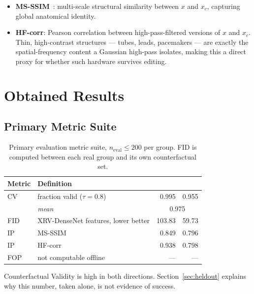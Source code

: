 \begin{itemize}[leftmargin=*]
  \item \textbf{MS-SSIM}~\cite{wang2003msssim}: multi-scale structural
        similarity between $x$ and $x_c$, capturing global anatomical
        identity.
  \item \textbf{HF-corr}: Pearson correlation between high-pass-filtered
        versions of $x$ and $x_c$. Thin, high-contrast structures ---
        tubes, leads, pacemakers --- are exactly the spatial-frequency
        content a Gaussian high-pass isolates, making this a direct proxy
        for whether such hardware survives editing.
\end{itemize}

\section{Obtained Results}

\subsection{Primary Metric Suite}

\begin{table}[h]
\centering
\caption[Primary evaluation metric suite]{Primary evaluation metric suite,
$n_{\text{eval}} \le 200$ per group. FID is computed between each real
group and its own counterfactual set.}
\label{tab:results}
\begin{tabular}{@{}llrr@{}}
\toprule
\textbf{Metric} & \textbf{Definition} & \textbf{\ntop{}} & \textbf{\pton{}} \\
\midrule
CV        & fraction valid ($\tau = 0.8$)      & 0.995 & 0.955 \\
          & \textit{mean}                       & \multicolumn{2}{c}{0.975} \\
FID       & XRV-DenseNet features, lower better & 103.83 & 59.73 \\
IP        & MS-SSIM                             & 0.849 & 0.796 \\
IP        & HF-corr                             & 0.938 & 0.798 \\
FOP       & not computable offline              & --- & --- \\
\bottomrule
\end{tabular}
\end{table}

Counterfactual Validity is high in both directions. Section~\ref{sec:heldout}
explains why this number, taken alone, is not evidence of success.

